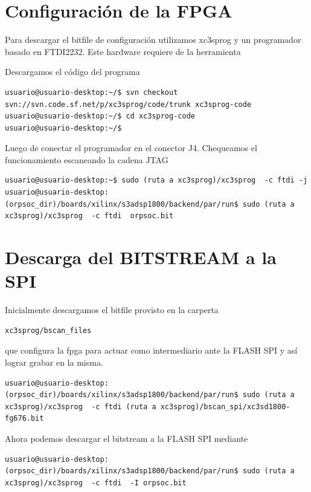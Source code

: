  \section{Configuración de la FPGA}

Para descargar el bitfile de configuración utilizamos xc3sprog y un programador basado en FTDI2232. Este hardware requiere de la herramienta 

Descargamos el código del programa
\begin{lstlisting}[breaklines]
usuario@usuario-desktop:~/$ svn checkout svn://svn.code.sf.net/p/xc3sprog/code/trunk xc3sprog-code
usuario@usuario-desktop:~/$ cd xc3sprog-code
usuario@usuario-desktop:~/$   
\end{lstlisting}



Luego de conectar el programador en el conector J4. Chequeamos el funcionamiento escaneando la cadena JTAG
\begin{lstlisting}[breaklines]
usuario@usuario-desktop:~$ sudo (ruta a xc3sprog)/xc3sprog  -c ftdi -j
usuario@usuario-desktop:(orpsoc_dir)/boards/xilinx/s3adsp1800/backend/par/run$ sudo (ruta a xc3sprog)/xc3sprog  -c ftdi  orpsoc.bit 
\end{lstlisting}

 \section{Descarga del BITSTREAM a la SPI }

Inicialmente descargamos el bitfile provisto en la carperta
\begin{lstlisting}[breaklines]
xc3sprog/bscan_files
\end{lstlisting} 
 que configura la fpga para actuar como intermediario ante la FLASH SPI y así lograr grabar en la misma.
\begin{lstlisting}[breaklines]
usuario@usuario-desktop:(orpsoc_dir)/boards/xilinx/s3adsp1800/backend/par/run$ sudo (ruta a xc3sprog)/xc3sprog  -c ftdi (ruta a xc3sprog)/bscan_spi/xc3sd1800-fg676.bit 
\end{lstlisting} 

Ahora podemos descargar el bitstream a la FLASH SPI mediante 
\begin{lstlisting}[breaklines]
usuario@usuario-desktop:(orpsoc_dir)/boards/xilinx/s3adsp1800/backend/par/run$ sudo (ruta a xc3sprog)/xc3sprog  -c ftdi  -I orpsoc.bit 
\end{lstlisting}